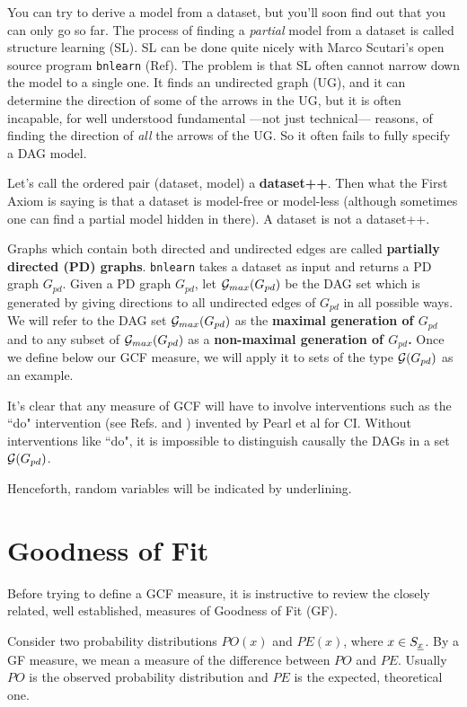 \documentclass[12pt]{article}
\begin{document}
You can try to derive a model from a dataset, 
but you'll soon find out that you can only go so far.
The process of finding a {\it partial} model from a dataset 
is called structure learning (SL).  SL can be done quite
 nicely with Marco Scutari's open source program 
{\tt bnlearn} (Ref\cite{bnlearn}).
The problem is that SL often cannot 
narrow down the model to a single one. It finds an undirected graph (UG), 
and it can determine the direction of some of the arrows in the UG, 
but it is often incapable, for well understood 
fundamental ---not just technical--- reasons,
 of finding the direction of {\it all}  the arrows of the UG. 
So it often fails to fully specify a DAG model.

Let's call the ordered pair (dataset, model) a 
{\bf dataset++}.
 Then what the First Axiom is saying is that a dataset 
is model-free or model-less (although sometimes one can 
find a partial model hidden in there). 
A dataset is not a dataset++.

Graphs
which contain both directed 
and undirected edges
are called 
{\bf partially directed (PD) graphs}.
{\tt bnlearn} takes
a dataset as input
and returns a PD graph
$G_{pd}$.
Given a PD graph $G_{pd}$,
let ${\cal G}_{max}(G_{pd})$
be the DAG set 
which 
is generated
by giving directions to all 
undirected edges of $G_{pd}$
in all possible ways.
We will refer to the
DAG set
 ${\cal G}_{max}(G_{pd})$ as the
 {\bf maximal generation of $G_{pd}$}
and to any subset of
${\cal G}_{max}(G_{pd})$ as a {\bf non-maximal 
generation of $G_{pd}$.}
Once we define below our
 GCF measure,
we will apply it to
sets of the type ${\cal G}(G_{pd})$
as an example.


It's clear that any measure
of GCF will have to
involve interventions
such as the ``do" intervention
(see 
Refs. \cite{pearl-2013book}
and \cite{bayesuvius})
invented by Pearl et al 
for CI.
Without interventions like ``do",
it is impossible
to distinguish causally the
DAGs in a set ${\cal G}(G_{pd})$.

Henceforth, random variables
will be indicated by underlining.

\section{Goodness of Fit}
Before trying to
define a GCF measure,
it
is instructive to review 
the closely related, well established, measures
of Goodness of Fit (GF). 



Consider 
two
probability distributions
$PO(x)$ and $PE(x)$,
where $x\in S_{\underline{x}}$.
By a GF measure, we mean 
a measure of the 
difference between 
$PO$ and $PE$.
Usually $PO$ is the
observed probability distribution and 
$PE$ is the expected, theoretical one.
\end{document}
